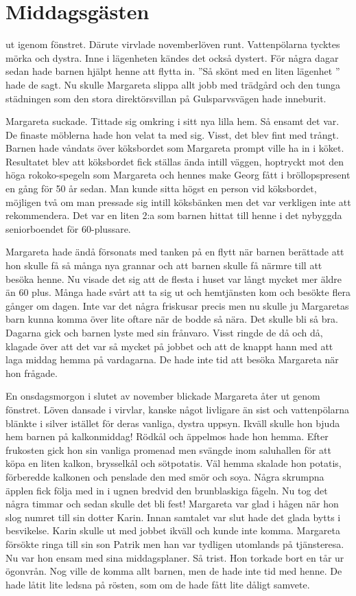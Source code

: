 \chapter[middagsgästen]{Middagsgästen}

 ut igenom fönstret. Därute virvlade novemberlöven runt. Vattenpölarna tycktes mörka och dystra. Inne i lägenheten kändes det också dystert. För några dagar sedan hade barnen hjälpt henne att flytta in. ”Så skönt med en liten lägenhet ” hade de sagt. Nu skulle Margareta slippa allt jobb med trädgård och den tunga städningen som den stora direktörsvillan på Gulsparvsvägen hade inneburit.

Margareta suckade. Tittade sig omkring i sitt nya lilla hem. Så ensamt det var. De finaste möblerna hade hon velat ta med sig. Visst, det blev fint med trångt. Barnen hade våndats över köksbordet som Margareta prompt ville ha in i köket. Resultatet blev att köksbordet fick ställas ända intill väggen, hoptryckt mot den höga rokoko-spegeln som Margareta och hennes make Georg fått i bröllopspresent en gång för 50 år sedan. Man kunde sitta högst en person vid köksbordet, möjligen två om man pressade sig intill köksbänken men det var verkligen inte att rekommendera. Det var en liten 2:a som barnen hittat till henne i det nybyggda seniorboendet för 60-plussare. 

Margareta hade ändå försonats med tanken på en flytt när barnen berättade att hon skulle få så många nya grannar och att barnen skulle få närmre till att besöka henne. Nu visade det sig att de flesta i huset var långt mycket mer äldre än 60 plus. Många hade svårt att ta sig ut och hemtjänsten kom och besökte flera gånger om dagen. Inte var det några friskusar precis men nu skulle ju Margaretas barn kunna komma över lite oftare när de bodde så nära. Det skulle bli så bra. Dagarna gick och barnen lyste med sin frånvaro. Visst ringde de då och då, klagade över att det var så mycket på jobbet och att de knappt hann med att laga middag hemma på vardagarna. De hade inte tid att besöka Margareta när hon frågade.

En onsdagsmorgon i slutet av november blickade Margareta åter ut genom fönstret. Löven dansade i virvlar, kanske något livligare än sist och vattenpölarna blänkte i silver istället för deras vanliga, dystra uppsyn. Ikväll skulle hon bjuda hem barnen på kalkonmiddag! Rödkål och äppelmos hade hon hemma. Efter frukosten gick hon sin vanliga promenad men svängde inom saluhallen för att köpa en liten kalkon, brysselkål och sötpotatis. Väl hemma skalade hon potatis, förberedde kalkonen och penslade den med smör och soya. Några skrumpna äpplen fick följa med in i ugnen bredvid den brunblaskiga fågeln. Nu tog det några timmar och sedan skulle det bli fest! Margareta var glad i hågen när hon slog numret till sin dotter Karin. Innan samtalet var slut hade det glada bytts i besvikelse. Karin skulle ut med jobbet ikväll och kunde inte komma. Margareta försökte ringa till sin son Patrik men han var tydligen utomlands på tjänsteresa. Nu var hon ensam med sina middagsplaner. Så trist. Hon torkade bort en tår ur ögonvrån. Nog ville de komma allt barnen, men de hade inte tid med henne. De hade låtit lite ledsna på rösten, som om de hade fått lite dåligt samvete. 

